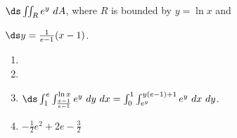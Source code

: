 {$\ds \iint_R e^y\ dA$, where $R$ is bounded by $y=\ln x$ and\par $\ds y=\frac{1}{e-1}(x-1)$.
}
{\begin{enumerate}
\item \noindent \begin{minipage}{.9\linewidth}
\end{minipage}
\item	
\item $\ds  \int_{1}^e\int_{\frac{x-1}{e-1}}^{\ln x}e^y\ dy\ dx = \int_{0}^1\int_{e^y}^{y(e-1)+1}e^y\ dx\ dy$.
\item $-\frac12e^2+2e-\frac32$
\end{enumerate}
}